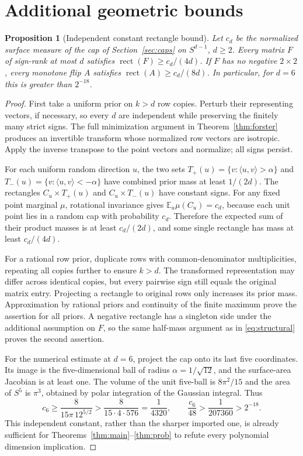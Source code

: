 \documentclass[11pt]{article}
\newtheorem{proposition}[theorem]{Proposition}
\DeclareMathOperator{\rect}{rect}
\newcommand{\E}{\mathbb E}
\newcommand{\1}{\mathbf 1}
\begin{document}
\section{Additional geometric bounds}\label{app:oldgeometry}
\begin{samepage}
\begin{proposition}[Independent constant rectangle bound]\label{prop:cap-bound}
Let $c_d$ be the normalized surface measure of the cap of Section~\ref{sec:caps} on $S^{d-1}$, $d\ge2$. Every matrix $F$ of sign-rank at most $d$ satisfies $\rect(F)\ge c_d/(4d)$. If $F$ has no negative $2\times2$, every monotone flip $A$ satisfies $\rect(A)\ge c_d/(8d)$. In particular, for $d=6$ this is greater than $2^{-18}$.
\end{proposition}
\end{samepage}
\begin{proof}
First take a uniform prior on $k>d$ row copies. Perturb their representing vectors, if necessary, so every $d$ are independent while preserving the finitely many strict signs. The full minimization argument in Theorem~\ref{thm:forster} produces an invertible transform whose normalized row vectors are isotropic. Apply the inverse transpose to the point vectors and normalize; all signs persist.

For each uniform random direction $u$, the two sets $T_+(u)=\{v:\langle u,v\rangle>\alpha\}$ and $T_-(u)=\{v:\langle u,v\rangle<-\alpha\}$ have combined prior mass at least $1/(2d)$. The rectangles $C_u\times T_+(u)$ and $C_u\times T_-(u)$ have constant signs. For any fixed point marginal $\mu$, rotational invariance gives $\E_u\mu(C_u)=c_d$, because each unit point lies in a random cap with probability $c_d$. Therefore the expected sum of their product masses is at least $c_d/(2d)$, and some single rectangle has mass at least $c_d/(4d)$.

For a rational row prior, duplicate rows with common-denominator multiplicities, repeating all copies further to ensure $k>d$. The transformed representation may differ across identical copies, but every pairwise sign still equals the original matrix entry. Projecting a rectangle to original rows only increases its prior mass. Approximation by rational priors and continuity of the finite maximum prove the assertion for all priors. A negative rectangle has a singleton side under the additional assumption on $F$, so the same half-mass argument as in \eqref{eq:structural} proves the second assertion.

For the numerical estimate at $d=6$, project the cap onto its last five coordinates. Its image is the five-dimensional ball of radius $\alpha=1/\sqrt{12}$, and the surface-area Jacobian is at least one. The volume of the unit five-ball is $8\pi^2/15$ and the area of $S^5$ is $\pi^3$, obtained by polar integration of the Gaussian integral. Thus
\[
 c_6\ge\frac8{15\pi\,12^{5/2}}>
 \frac8{15\cdot4\cdot576}=\frac1{4320},
 \qquad \frac{c_6}{48}>\frac1{207360}>2^{-18}.
\]
This independent constant, rather than the sharper imported one, is already sufficient for Theorems~\ref{thm:main}--\ref{thm:prob} to refute every polynomial dimension implication.
\end{proof}
\end{document}
